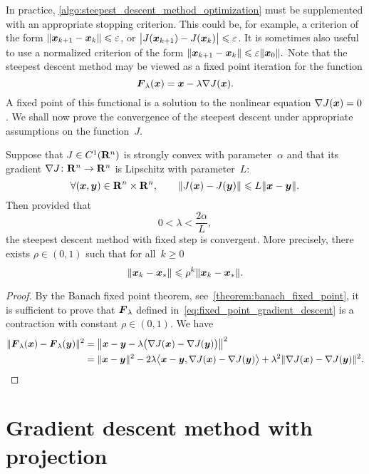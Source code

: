 In practice, \cref{algo:steepest_descent_method_optimization} must be supplemented with an appropriate stopping criterion.
This could be, for example, a criterion of the form $\norm{\vect x_{k+1} - \vect x_k} \leq \varepsilon$,
or $\bigl\lvert J(\vect x_{k+1}) - J(\vect x_k) \bigr\rvert \leq \varepsilon$.
It is sometimes also useful to use a normalized criterion of the form $\norm{\vect x_{k+1} - \vect x_k} \leq \varepsilon \norm{\vect x_0}.$
Note that the steepest descent method may be viewed as a fixed point iteration for the function
\begin{equation}
    \label{eq:fixed_point_gradient_descent}
    \vect F_{\lambda}(\vect x) = \vect x - \lambda \nabla J(\vect x).
\end{equation}
A fixed point of this functional is a solution to the nonlinear equation $\nabla J(\vect x) = 0$.
We shall now prove the convergence of the steepest descent under appropriate assumptions on the function~$J$.
\begin{theorem}
    \label{theorem:convergence_steepest_descent_optimization}
    Suppose that $J \in C^1(\real^n)$ is strongly convex with parameter~$\alpha$ and that
    its gradient $\nabla J \colon \real^n \to \real^n$ is Lipschitz with parameter~$L$:
    \[
        \forall (\vect x, \vect y) \in \real^n \times \real^n, \qquad
        \norm{J(\vect x) - J(\vect y)} \leq L \norm{\vect x - \vect y}.
    \]
    Then provided that
    \[
        0 < \lambda < \frac{2 \alpha}{L},
    \]
    the steepest descent method with fixed step is convergent.
    More precisely,
    there exists $\rho \in (0, 1)$ such that for all~$k \geq 0$
    \[
        \norm{\vect x_k - \vect x_*} \leq \rho^k \norm{\vect x_k - \vect x_*}.
    \]
\end{theorem}
\begin{proof}
    By the Banach fixed point theorem,
    see~\cref{theorem:banach_fixed_point},
    it is sufficient to prove that $\vect F_{\lambda}$ defined in~\eqref{eq:fixed_point_gradient_descent} is a contraction with constant $\rho \in (0, 1)$.
    We have
    \begin{align*}
        \norm{ \vect F_{\lambda}(\vect x) - \vect F_{\lambda}(\vect y) }^2
        &= \norm*{ \vect x - \vect y - \lambda \bigl(\nabla J(\vect x) - \nabla J(\vect y) \bigr) }^2 \\
        &= \norm{\vect x - \vect y}^2 - 2 \lambda \ip[\big]{\vect x - \vect y, \nabla J(\vect x) - \nabla J(\vect y)} + \lambda^2 \norm{\nabla J(\vect x) - \nabla J(\vect y)}^2.
    \end{align*}
\end{proof}

\section{Gradient descent method with projection}

